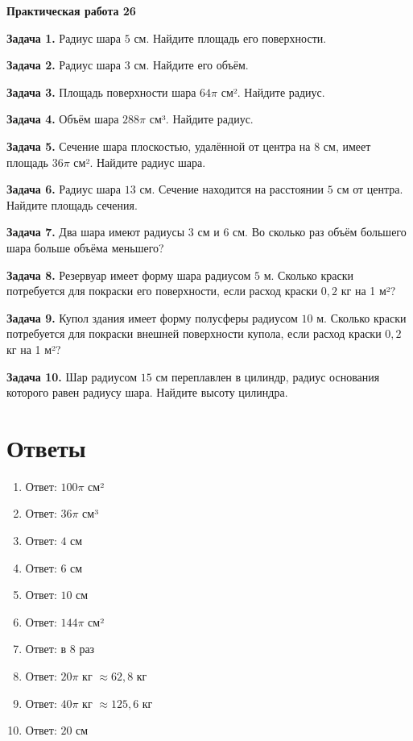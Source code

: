 \documentclass{umk-matematika}
\begin{document}
\begin{center}
{\Large\bfseries Практическая работа 26}
\end{center}
\vspace{0.5cm}

\textbf{Задача 1.} Радиус шара $5$ см. Найдите площадь его поверхности.\par\vspace{10pt}
\textbf{Задача 2.} Радиус шара $3$ см. Найдите его объём.\par\vspace{10pt}
\textbf{Задача 3.} Площадь поверхности шара $64\pi$ см². Найдите радиус.\par\vspace{10pt}
\textbf{Задача 4.} Объём шара $288\pi$ см³. Найдите радиус.\par\vspace{10pt}
\textbf{Задача 5.} Сечение шара плоскостью, удалённой от центра на $8$ см, имеет площадь $36\pi$ см². Найдите радиус шара.\par\vspace{10pt}
\textbf{Задача 6.} Радиус шара $13$ см. Сечение находится на расстоянии $5$ см от центра. Найдите площадь сечения.\par\vspace{10pt}
\textbf{Задача 7.} Два шара имеют радиусы $3$ см и $6$ см. Во сколько раз объём большего шара больше объёма меньшего?\par\vspace{10pt}
\textbf{Задача 8.} Резервуар имеет форму шара радиусом $5$ м. Сколько краски потребуется для покраски его поверхности, если расход краски $0{,}2$ кг на 1 м²?\par\vspace{10pt}
\textbf{Задача 9.} Купол здания имеет форму полусферы радиусом $10$ м. Сколько краски потребуется для покраски внешней поверхности купола, если расход краски $0{,}2$ кг на 1 м²?\par\vspace{10pt}
\textbf{Задача 10.} Шар радиусом $15$ см переплавлен в цилиндр, радиус основания которого равен радиусу шара. Найдите высоту цилиндра.\par\vspace{10pt}
\newpage
\section*{Ответы}

\begin{enumerate}
  \item Ответ: $100\pi$ см²
  \item Ответ: $36\pi$ см³
  \item Ответ: $4$ см
  \item Ответ: $6$ см
  \item Ответ: $10$ см
  \item Ответ: $144\pi$ см²
  \item Ответ: в $8$ раз
  \item Ответ: $20\pi$ кг $\approx 62{,}8$ кг
  \item Ответ: $40\pi$ кг $\approx 125{,}6$ кг
  \item Ответ: $20$ см
\end{enumerate}
\end{document}
